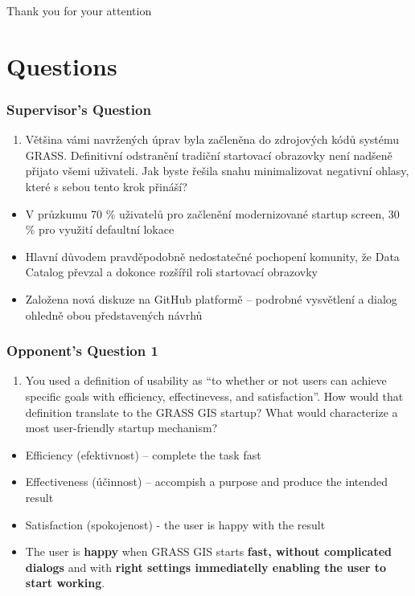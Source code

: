 \documentclass[aspectratio=169]{beamer}
\begin{document}
\begin{frame}
\begin{center}
{\fontsize{20}{40}\selectfont Thank you for your attention}
\end{center}
\end{frame}

\section{Questions}

\begin{frame}
\frametitle{Supervisor's Question}
\begin{enumerate}
\item{Většina vámi navržených úprav byla začleněna do zdrojových kódů systému GRASS. Definitivní odstranění tradiční startovací obrazovky není nadšeně přijato všemi uživateli. Jak byste řešila snahu minimalizovat negativní ohlasy, které s sebou tento krok přináší?}
\end{enumerate}
\begin{itemize}
\vspace{0.3cm}
\item{V průzkumu 70 \% uživatelů pro začlenění modernizované startup screen, 30 \% pro využití defaultní lokace}
\item{Hlavní důvodem pravděpodobně nedostatečné pochopení komunity, že Data Catalog převzal a dokonce rozšířil roli startovací obrazovky}
\item{Založena nová diskuze na GitHub platformě -- podrobné vysvětlení a dialog ohledně obou představených návrhů}

\end{itemize}
\end{frame}

\begin{frame}
\frametitle{Opponent's Question 1}
\begin{enumerate}
\item{You used a definition of usability as ``to whether or not users can achieve specific goals with efficiency, effectinevess, and satisfaction''. How would that definition translate to the GRASS GIS startup? What would characterize a most user-friendly startup mechanism?}
\end{enumerate}
\begin{itemize}
\vspace{0.3cm}
\item{Efficiency (efektivnost) -- complete the task fast}
\item{Effectiveness (účinnost) -- accompish a purpose and produce the intended result}
\item{Satisfaction (spokojenost) - the user is happy with the result}
\vspace{0.3cm}
\item{The user is \textbf{happy} when GRASS GIS starts \textbf{fast, without complicated dialogs} and with \textbf{right settings immediatelly enabling the user to start working}.}
\end{itemize}
\end{frame}
\end{document}
